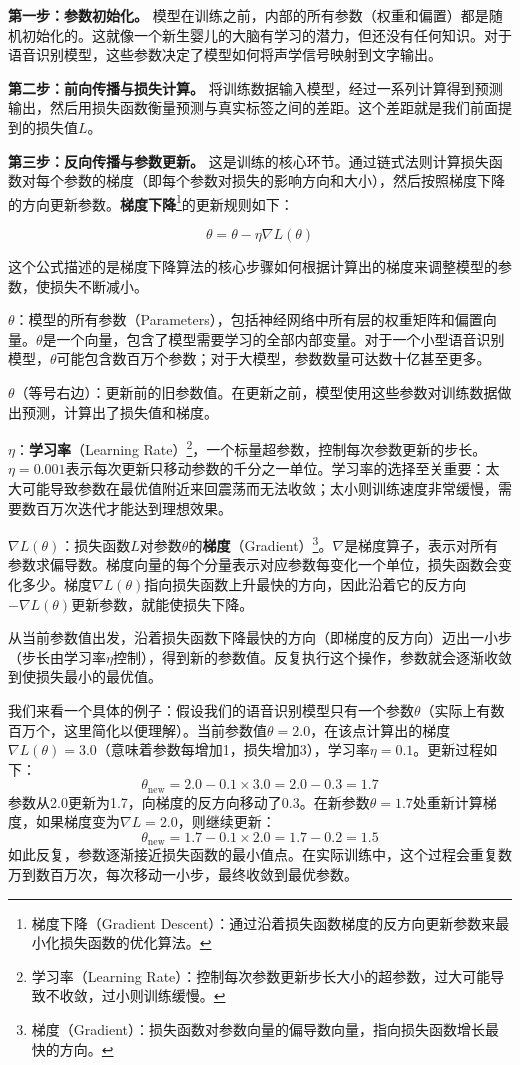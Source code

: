 \textbf{第一步：参数初始化。} 模型在训练之前，内部的所有参数（权重和偏置）都是随机初始化的。这就像一个新生婴儿的大脑有学习的潜力，但还没有任何知识。对于语音识别模型，这些参数决定了模型如何将声学信号映射到文字输出。

\textbf{第二步：前向传播与损失计算。} 将训练数据输入模型，经过一系列计算得到预测输出，然后用损失函数衡量预测与真实标签之间的差距。这个差距就是我们前面提到的损失值$L$。

\textbf{第三步：反向传播与参数更新。} 这是训练的核心环节。通过链式法则计算损失函数对每个参数的梯度（即每个参数对损失的影响方向和大小），然后按照梯度下降的方向更新参数。\textbf{梯度下降}\footnote{梯度下降（Gradient Descent）：通过沿着损失函数梯度的反方向更新参数来最小化损失函数的优化算法。}的更新规则如下：

\[
\theta = \theta - \eta \nabla L(\theta)
\]

这个公式描述的是梯度下降算法的核心步骤如何根据计算出的梯度来调整模型的参数，使损失不断减小。



$\theta$：模型的所有参数（Parameters），包括神经网络中所有层的权重矩阵和偏置向量。$\theta$是一个向量，包含了模型需要学习的全部内部变量。对于一个小型语音识别模型，$\theta$可能包含数百万个参数；对于大模型，参数数量可达数十亿甚至更多。

$\theta$（等号右边）：更新前的旧参数值。在更新之前，模型使用这些参数对训练数据做出预测，计算出了损失值和梯度。

$\eta$：\textbf{学习率}（Learning Rate）\footnote{学习率（Learning Rate）：控制每次参数更新步长大小的超参数，过大可能导致不收敛，过小则训练缓慢。}，一个标量超参数，控制每次参数更新的步长。$\eta=0.001$表示每次更新只移动参数的千分之一单位。学习率的选择至关重要：太大可能导致参数在最优值附近来回震荡而无法收敛；太小则训练速度非常缓慢，需要数百万次迭代才能达到理想效果。

$\nabla L(\theta)$：损失函数$L$对参数$\theta$的\textbf{梯度}（Gradient）\footnote{梯度（Gradient）：损失函数对参数向量的偏导数向量，指向损失函数增长最快的方向。}。$\nabla$是梯度算子，表示对所有参数求偏导数。梯度向量的每个分量表示对应参数每变化一个单位，损失函数会变化多少。梯度$\nabla L(\theta)$指向损失函数上升最快的方向，因此沿着它的反方向$-\nabla L(\theta)$更新参数，就能使损失下降。

从当前参数值出发，沿着损失函数下降最快的方向（即梯度的反方向）迈出一小步（步长由学习率$\eta$控制），得到新的参数值。反复执行这个操作，参数就会逐渐收敛到使损失最小的最优值。

我们来看一个具体的例子：假设我们的语音识别模型只有一个参数$\theta$（实际上有数百万个，这里简化以便理解）。当前参数值$\theta=2.0$，在该点计算出的梯度$\nabla L(\theta)=3.0$（意味着参数每增加1，损失增加3），学习率$\eta=0.1$。更新过程如下：
\[
\theta_{\text{new}} = 2.0 - 0.1 \times 3.0 = 2.0 - 0.3 = 1.7
\]
参数从2.0更新为1.7，向梯度的反方向移动了0.3。在新参数$\theta=1.7$处重新计算梯度，如果梯度变为$\nabla L=2.0$，则继续更新：
\[
\theta_{\text{new}} = 1.7 - 0.1 \times 2.0 = 1.7 - 0.2 = 1.5
\]
如此反复，参数逐渐接近损失函数的最小值点。在实际训练中，这个过程会重复数万到数百万次，每次移动一小步，最终收敛到最优参数。

